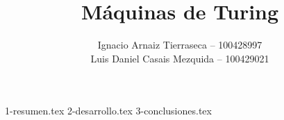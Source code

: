 \documentclass[es]{uc3mreport}
\author{
  Ignacio Arnaiz Tierraseca -- 100428997\\
  Luis Daniel Casais Mezquida -- 100429021
}
\title{Máquinas de Turing}
\begin{document}
  \makecover[old]

  \tableofcontents
  \listoffigures
  \listoftables

  \begin{report}
    {1-resumen.tex}
    {2-desarrollo.tex}
    {3-conclusiones.tex}
  \end{report}

  \makebibliography

  \begin{appendices}
  \end{appendices}
\end{document}
